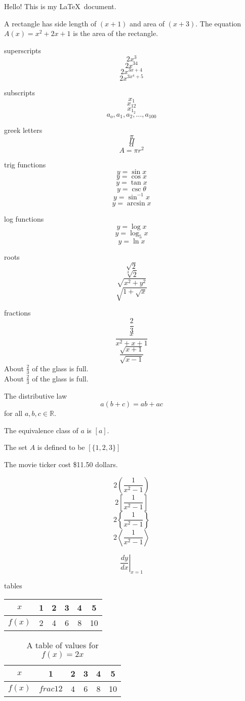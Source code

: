 \documentclass[11pt]{article}
\begin{document}
 
Hello! This is my \LaTeX\ document.

A rectangle has side length of $(x+1)$ and area of $(x+3)$. The equation $A(x)=x^2+2x+1$ is the area of the rectangle.

superscripts $$2x^3$$
$$2x^{34}$$
$$2x^{3x+4}$$
$$2x^{3x^4+5}$$

subscripts $$x_1$$
$$x_{12}$$
$$x_{1_2}$$
$$a_o,a_1,a_2,\ldots,a_{100}$$

greek letters $$\pi$$
$$\Pi$$
$$\alpha$$
$$A=\pi r^2$$

trig functions $$y=\sin x$$
$$y=\cos x$$
$$y=\tan x$$
$$y=\csc \theta$$
$$y=\sin^{-1} x$$
$$y=\arcsin x$$

log functions $$y=\log x$$
$$y=\log_5 x$$
$$y=\ln x$$

roots $$\sqrt{2}$$
$$\sqrt[3]{2}$$
$$\sqrt{x^2+y^2}$$
$$\sqrt{1+\sqrt{x}}$$

fractions $$\frac{2}{3}$$
$$\frac{x}{x^2+x+1}$$
$$\frac{\sqrt{x+1}}{\sqrt{x-1}}$$
About $\displaystyle \frac{2}{3}$ of the glass is full.\\[16pt]
About $\displaystyle \frac{2}{3}$ of the glass is full.

The distributive law $$a(b+c)=ab+ac$$ for all $a, b, c \in \mathbb{R}$.

The equivalence class of $a$ is $[a]$.

The set $A$ is defined to be $[\{1, 2, 3\}]$

The movie ticker cost \$11.50 dollars.

$$2\left(\frac{1}{x^2-1}\right)$$ 
$$2\left[\frac{1}{x^2-1}\right]$$ 
$$2\left\{\frac{1}{x^2-1}\right\}$$
$$2\left\langle\frac{1}{x^2-1}\right\rangle$$

$$\left.\frac{dy}{dx}\right|_{x=1}$$

tables\\[6pt]
\begin{tabular}{|c||c|c|c|c|c|}
 \hline
 $x$ & 1 & 2 & 3 & 4 & 5 \\ \hline
 $f(x)$ & 2 & 4 & 6 & 8 & 10 \\ \hline
\end{tabular}

\vspace{1cm}

\begin{table}[H]
\centering
\def\arraystretch{1.2}
\begin{tabular}{|c||c|c|c|c|c|}
\hline
$x$ & 1 & 2 & 3 & 4 & 5 \\ \hline
$f(x)$ & $frac{1}{2}$ & 4 & 6 & 8 & 10 \\ \hline
\end{tabular}
\caption{A table of values for $f(x)=2x$}
\end{table}
\end{document}
